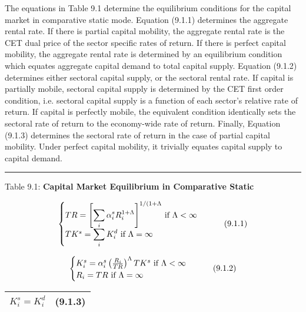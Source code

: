 \documentclass[12pt]{article}
\begin{document}
The equations in Table 9.1 determine the equilibrium conditions for the capital market in comparative static mode. Equation (9.1.1) determines the aggregate rental rate. If there is partial capital mobility, the aggregate rental rate is the CET dual price of the sector specific rates of return. If there is perfect capital mobility, the aggregate rental rate is determined by an equilibrium condition which equates aggregate capital demand to total capital supply. Equation (9.1.2) determines either sectoral capital supply, or the sectoral rental rate. If capital is partially mobile, sectoral capital supply is determined by the CET first order condition, i.e. sectoral capital supply is a function of each sector's relative rate of return. If capital is perfectly mobile, the equivalent condition identically sets the sectoral rate of return to the economy-wide rate of return. Finally, Equation (9.1.3) determines the sectoral rate of return in the case of partial capital mobility. Under perfect capital mobility, it trivially equates capital supply to capital demand.

\noindent\rule{\linewidth}{0.4pt}
\begin{center}
\begin{large}
{\centering Table 9.1: \textbf{Capital Market Equilibrium in Comparative Static} \par}

\begin{equation}
    \begin{cases}
      $$TR = \left[\displaystyle \sum_i \alpha^s_i R^{1 + \Lambda}_i \right]^{1/(1+\Lambda}$$ \text{ if } $$\Lambda < \infty$$\\
      $$TK^s = \displaystyle \sum_i K^d_i$$ \text{ if } $$\Lambda = \infty$$\\
    \end{cases}
    \tag{9.1.1}
\end{equation}

\begin{equation}
    \begin{cases}
      $$K^s_i = \alpha^s_i \left(\frac{R_i}{TR} \right)^\Lambda TK^s$$ \text{ if } $$\Lambda < \infty$$\\
      $$R_i = TR$$ \text{ if } $$\Lambda = \infty$$\\
    \end{cases}
    \tag{9.1.2}
\end{equation}

\begin{tabular}{>{\raggedright}p{} l}

$K^s_i = K^d_i$ & \hfill (9.1.3)\\[20pt]

\hline
\end{tabular}
\end{large}
\end{center}
\end{document}

